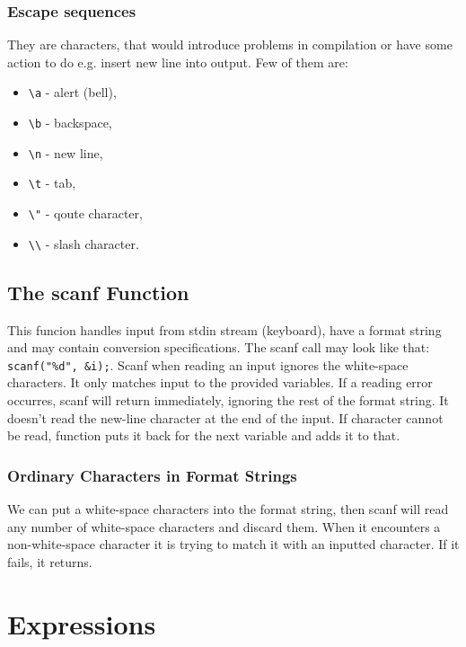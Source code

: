 \documentclass[12pt, openany]{book}
\begin{document}
    \subsection*{Escape sequences}
    They are characters, that would introduce problems in compilation or have some action
    to do e.g. insert new line into output. Few of them are:
    \begin{itemize}
        \item \texttt{\textbackslash a} - alert (bell),
        \item \texttt{\textbackslash b} - backspace,
        \item \texttt{\textbackslash n} - new line,
        \item \texttt{\textbackslash t} - tab,
        \item \texttt{\textbackslash "} - qoute character,
        \item \texttt{\textbackslash\textbackslash} - slash character.
    \end{itemize}

    \section{The scanf Function}
    This funcion handles input from stdin stream (keyboard),  have a format string
    and may contain conversion specifications. The scanf call may look like that:
    \texttt{scanf("\%d", \&i);}. Scanf when reading an input ignores the white-space
    characters. It only matches input to the provided variables. If a reading error
    occurres, scanf will return immediately, ignoring the rest of the format string.
    It doesn't read the new-line character at the end of the input. If character
    cannot be read, function puts it back for the next variable and adds it to that.

    \subsection*{Ordinary Characters in Format Strings}
    We can put a white-space characters into the format string, then scanf will read
    any number of white-space characters and discard them. When it encounters a
    non-white-space character it is trying to match it with an inputted character.
    If it fails, it returns.

    \chapter{Expressions}
\end{document}

